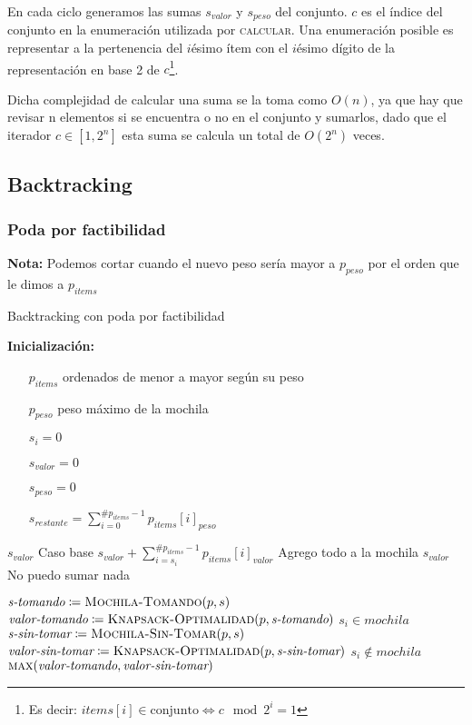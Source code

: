 \documentclass[fleqn, 11pt]{article}
\def\is{\coloneqq}
\begin{document}
En cada ciclo generamos las sumas $s_{valor}$ y $s_{peso}$ del conjunto. $c$ es
el índice del conjunto en la enumeración utilizada por \textsc{calcular}. Una
enumeración posible es representar a la pertenencia del $i$ésimo ítem con el
$i$ésimo dígito de la representación en base 2 de $c$\footnote{Es decir:
$items[i] \in \text{conjunto} \iff c \mod 2^i = 1$}.

Dicha complejidad de calcular una suma se la toma como $O(n)$, ya que hay que
revisar n elementos si se encuentra o no en el conjunto y sumarlos, dado que el
iterador $c \in [1,2^n]$ esta suma se calcula un total de $O(2^n)$ veces.

\subsection{Backtracking}
\subsubsection{Poda por factibilidad}
\textbf{Nota:} Podemos cortar cuando el nuevo peso sería mayor a $p_{peso}$ por
el orden que le dimos a $p_{items}$

\begin{algorithm}
\caption{Backtracking con poda por factibilidad}
\begin{algorithmic}[1]
\item[\textbf{Inicialización:}]
\item[] \begin{itemize}
	\item[] $p_{items}$ ordenados de menor a mayor según su peso
	\item[] $p_{peso}$ peso máximo de la mochila
	\item[] $s_i = 0$
	\item[] $s_{valor} = 0$
	\item[] $s_{peso} = 0$
	\item[] $s_{restante} = \sum_{i = 0}^{\#p_{items} - 1} p_{items}[i]_{peso}$
\end{itemize}
\Statex
{}
	\State \Return $s_{valor}$
	\Comment Caso base
\EndIf
{}
	\State \Return $s_{valor} + \sum_{i=s_i}^{\#p_{items} - 1} p_{items}[i]_{valor}$
	\Comment Agrego todo a la mochila
\EndIf
{}
	\State \Return $s_{valor}$
	\Comment No puedo sumar nada
\EndIf

\State $\textit{s-tomando} \is \Call{Mochila-Tomando}{p, s}$
\State $\textit{valor-tomando} \is \Call{Knapsack-Optimalidad}{p, \textit{s-tomando}}$
\Comment $s_i \in mochila$
\State $\textit{s-sin-tomar} \is \Call{Mochila-Sin-Tomar}{p, s}$
\State $\textit{valor-sin-tomar} \is \Call{Knapsack-Optimalidad}{p, \textit{s-sin-tomar}}$
\Comment $s_i \not\in mochila$
\State \Return $\Call{max}{\textit{valor-tomando}, \textit{valor-sin-tomar}}$
\EndFunction
\end{algorithmic}
\end{algorithm}
\end{document}
